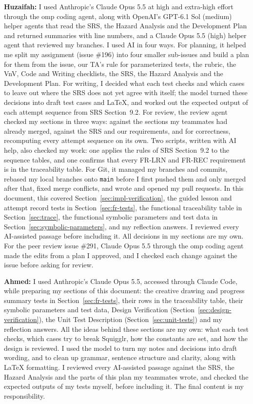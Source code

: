 \documentclass[12pt, titlepage]{article}
\begin{document}
\textbf{Huzaifah:} I used Anthropic's Claude Opus 5.5 at high and extra-high
effort through the omp coding agent, along with OpenAI's GPT-6.1 Sol (medium)
helper agents that read the SRS, the Hazard Analysis and the Development Plan
and returned summaries with line numbers, and a Claude Opus 5.5 (high) helper
agent that reviewed my branches. I used AI in four ways. For planning, it
helped me split my assignment (issue \#196) into four smaller sub-issues and
build a plan for them from the issue, our TA's rule for parameterized tests,
the rubric, the VnV, Code and Writing checklists, the SRS, the Hazard
Analysis and the Development Plan. For writing, I decided what each test
checks and which cases to leave out where the SRS does not yet agree with
itself; the model turned these decisions into draft test cases and \LaTeX{},
and worked out the expected output of each attempt sequence from SRS
Section~9.2. For review, the review agent checked my sections in three ways:
against the sections my teammates had already merged, against the SRS and
our requirements, and for correctness, recomputing every attempt sequence on
its own. Two scripts, written with AI help, also checked my work: one applies
the rules of SRS Section~9.2 to the sequence tables, and one confirms that
every FR-LRN and FR-REC requirement is in the traceability table. For Git, it
managed my branches and commits, rebased my local branches onto
\texttt{main} before I first pushed them and only merged after that, fixed
merge conflicts, and wrote and opened my pull requests. In this
document, this covered Section~\ref{sec:impl-verification}, the guided lesson and attempt record
tests in Section~\ref{sec:fr-tests}, the functional traceability table in Section~\ref{sec:trace}, the
functional symbolic parameters and test data in Section~\ref{sec:symbolic-parameters}, and my
reflection answers. I reviewed every AI-assisted passage before including it.
All decisions in my sections are my own.
For the peer review issue \#291, Claude Opus 5.5 through the omp coding
agent made the edits from a plan I approved, and I checked each change
against the issue before asking for review.

\textbf{Ahmed:} I used Anthropic's Claude Opus 5.5, accessed through Claude
Code, while preparing my sections of this document: the creative drawing and
progress summary tests in Section~\ref{sec:fr-tests}, their rows in the traceability table,
their symbolic parameters and test data, Design Verification
(Section~\ref{sec:design-verification}), the Unit Test Description
(Section~\ref{sec:unit-tests}) and my reflection answers. All the ideas behind
these sections are my own: what each test checks, which cases try to break
Squigglr, how the constants are set, and how the design is reviewed. I used
the model to turn my notes and decisions into draft wording, and to clean up
grammar, sentence structure and clarity, along with \LaTeX{} formatting. I
reviewed every AI-assisted passage against the SRS, the Hazard Analysis and the
parts of this plan my teammates wrote, and checked the expected outputs of my
tests myself, before including it. The final content is my responsibility.
\end{document}
